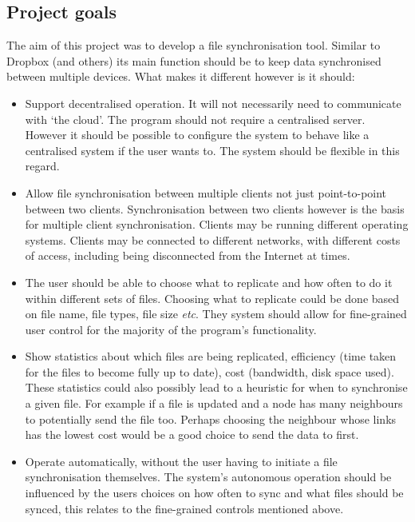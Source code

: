 \documentclass[12pt]{article}
\begin{document}
\subsection{Project goals}
The aim of this project was to develop a file synchronisation tool.
Similar to  Dropbox (and others) its main function should be to
keep data synchronised between multiple devices.
What makes it different however is it should:
\begin{itemize}
\item Support decentralised operation. It will not necessarily need to communicate with
`the cloud'. The program should not require a
centralised server. However it should be
possible to configure the system to behave like a centralised system if the user wants to.
The system should be flexible in this regard.

\item Allow file synchronisation between multiple clients not just point-to-point
between two clients. Synchronisation between two clients however is the
basis for multiple client synchronisation. Clients may be
running different operating systems. Clients may be connected to
different networks, with different costs of access, including being disconnected
from the Internet at times.

\item The user should be able to choose what to replicate and how often to do
it within different sets of files. Choosing what to replicate could be done
based on file name, file types, file size \emph{etc}. They system should
allow for fine-grained user control for the majority of the program's functionality.

\item Show statistics about which files are being replicated, efficiency (time
taken for the files to become fully up to date),
cost (bandwidth, disk space used). These statistics could also possibly lead
to a heuristic for when to synchronise a given file. For example if a file is
updated and a node has many neighbours to potentially send the file too. Perhaps
choosing the neighbour whose links has the lowest cost would be a good choice
to send the data to first.

\item Operate automatically, without the user having to initiate a file
synchronisation themselves. 
The system's autonomous operation should be influenced by the users
choices on how often to sync and what files should be synced, this
relates to the fine-grained controls mentioned above.
\end{itemize}
\end{document}
